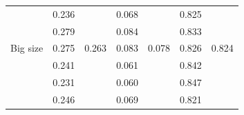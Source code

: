 \documentclass[conference]{IEEEtran}
\begin{document}
\begin{table}[]
\begin{tabular}{|l|cc|cc|cc|}
                                                      & \multicolumn{1}{c|}{\cellcolor[HTML]{FFFFFF}0.236} & \cellcolor[HTML]{FFFFFF}                         & \multicolumn{1}{c|}{\cellcolor[HTML]{FFFFFF}0.068} & \cellcolor[HTML]{FFFFFF}                           & \multicolumn{1}{c|}{\cellcolor[HTML]{FFFFFF}0.825} & \cellcolor[HTML]{FFFFFF}                        \\ \cline{2-2} \cline{4-4} \cline{6-6}
                                                      & \multicolumn{1}{c|}{\cellcolor[HTML]{FFFFFF}0.279} & \cellcolor[HTML]{FFFFFF}                         & \multicolumn{1}{c|}{\cellcolor[HTML]{FFFFFF}0.084} & \cellcolor[HTML]{FFFFFF}                           & \multicolumn{1}{c|}{\cellcolor[HTML]{FFFFFF}0.833} & \cellcolor[HTML]{FFFFFF}                        \\ \cline{2-2} \cline{4-4} \cline{6-6}
  \multirow{-5}{*}{Big size}             & \multicolumn{1}{c|}{\cellcolor[HTML]{FFFFFF}0.275} & \multirow{-5}{*}{\cellcolor[HTML]{FFFFFF}0.263} & \multicolumn{1}{c|}{\cellcolor[HTML]{FFFFFF}0.083} & \multirow{-5}{*}{\cellcolor[HTML]{FFFFFF}0.078} & \multicolumn{1}{c|}{\cellcolor[HTML]{FFFFFF}0.826} & \multirow{-5}{*}{\cellcolor[HTML]{FFFFFF}0.824} \\ \hline
                                                      & \multicolumn{1}{c|}{\cellcolor[HTML]{FFFFFF}0.241} & \cellcolor[HTML]{FFFFFF}                         & \multicolumn{1}{c|}{\cellcolor[HTML]{FFFFFF}0.061} & \cellcolor[HTML]{FFFFFF}                           & \multicolumn{1}{c|}{\cellcolor[HTML]{FFFFFF}0.842} & \cellcolor[HTML]{FFFFFF}                        \\ \cline{2-2} \cline{4-4} \cline{6-6}
                                                      & \multicolumn{1}{c|}{\cellcolor[HTML]{FFFFFF}0.231} & \cellcolor[HTML]{FFFFFF}                         & \multicolumn{1}{c|}{\cellcolor[HTML]{FFFFFF}0.060}  & \cellcolor[HTML]{FFFFFF}                           & \multicolumn{1}{c|}{\cellcolor[HTML]{FFFFFF}0.847} & \cellcolor[HTML]{FFFFFF}                        \\ \cline{2-2} \cline{4-4} \cline{6-6}
                                                      & \multicolumn{1}{c|}{\cellcolor[HTML]{FFFFFF}0.246} & \cellcolor[HTML]{FFFFFF}                         & \multicolumn{1}{c|}{\cellcolor[HTML]{FFFFFF}0.069} & \cellcolor[HTML]{FFFFFF}                           & \multicolumn{1}{c|}{\cellcolor[HTML]{FFFFFF}0.821} & \cellcolor[HTML]{FFFFFF}                        \\ \cline{2-2} \cline{4-4} \cline{6-6}

\end{tabular}
\end{table}
\end{document}
